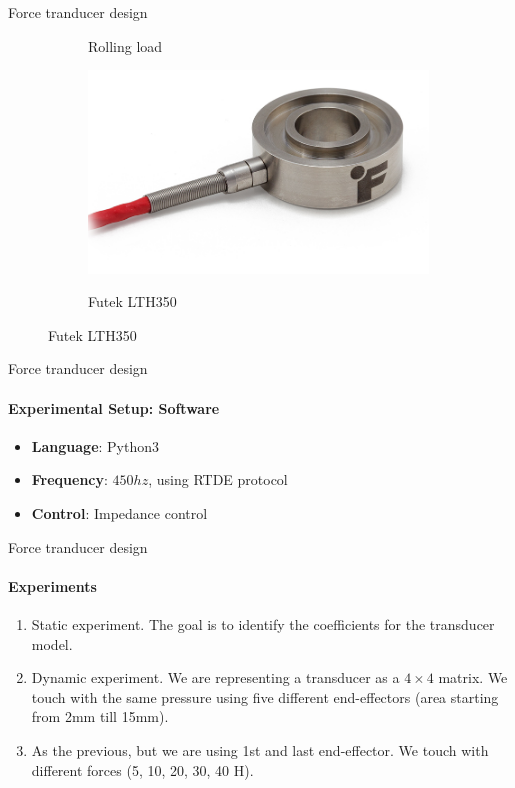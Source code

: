 \documentclass[aspectratio=169]{beamer}
\begin{document}
\begin{frame}[t]{Force tranducer design}
\begin{figure}[H]
\begin{subfigure}[b]{0.29\textwidth}
            \caption{Rolling load}
            \label{fig:rolling_load}
        \end{subfigure}
        \begin{subfigure}[b]{0.29\textwidth}
            \centering\includegraphics[width=0.99\textwidth]{LTH350-DONUT-LOAD-CELL-1.png}\\
            \caption{Futek LTH350}
            \label{fig:futek}
        \end{subfigure}
    \end{figure}
\end{frame}

\begin{frame}[t]{Force tranducer design}
    \framesubtitle{Experimental Setup: Software}
    {\Large
        \begin{itemize}
            \item \textbf{Language}: Python3
            \item \textbf{Frequency}: $450 hz$, using RTDE protocol
            \item \textbf{Control}: Impedance control
        \end{itemize}
    }
\end{frame}


\begin{frame}[t]{Force tranducer design}
    \framesubtitle{Experiments}
    \vspace{-15pt}
    {\large
        \begin{enumerate}
            \item Static experiment. The goal is to identify the coefficients for the transducer model.
            \item Dynamic experiment. We are representing a transducer as a $4\times4$ matrix. We touch with the same pressure using five different end-effectors (area starting from 2mm till 15mm).
            \item As the previous, but we are using 1st and last end-effector. We touch with different forces (5, 10, 20, 30, 40 H).
        \end{enumerate}
    }
\end{frame}
\end{document}
